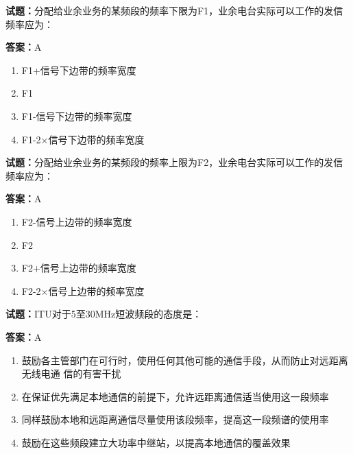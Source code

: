 \documentclass{ctexbook}
\begin{document}




\vspace{1em}

\textbf{试题：}分配给业余业务的某频段的频率下限为F1，业余电台实际可以工作的发信频率应为： 

\textbf{答案：}A 

\begin{enumerate}[leftmargin=3em]
  \item F1+信号下边带的频率宽度 

  \item F1 

  \item F1-信号下边带的频率宽度 

  \item F1-2×信号下边带的频率宽度 

\end{enumerate}





\vspace{1em}

\textbf{试题：}分配给业余业务的某频段的频率上限为F2，业余电台实际可以工作的发信频率应为： 

\textbf{答案：}A 

\begin{enumerate}[leftmargin=3em]
  \item F2-信号上边带的频率宽度 

  \item F2 

  \item F2+信号上边带的频率宽度 

  \item F2-2×信号上边带的频率宽度 

\end{enumerate}





\vspace{1em}

\textbf{试题：}ITU对于5至30MHz短波频段的态度是： 

\textbf{答案：}A 

\begin{enumerate}[leftmargin=3em]
  \item 鼓励各主管部门在可行时，使用任何其他可能的通信手段，从而防止对远距离无线电通
信的有害干扰 

  \item 在保证优先满足本地通信的前提下，允许远距离通信适当使用这一段频率 

  \item 同样鼓励本地和远距离通信尽量使用该段频率，提高这一段频谱的使用率 

  \item 鼓励在这些频段建立大功率中继站，以提高本地通信的覆盖效果 

\end{enumerate}
\end{document}
